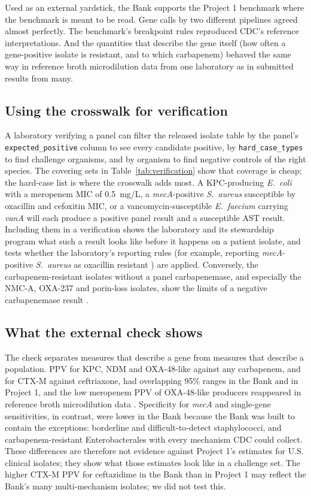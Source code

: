 \documentclass[10pt,twocolumn,letterpaper]{article}
\newcommand{\g}[1]{\textit{#1}}  %
\newcommand{\sau}{\textit{S.~aureus}}
\begin{document}
Used as an external yardstick, the Bank supports the Project 1 benchmark where the benchmark is meant to be read. Gene
calls by two different pipelines agreed almost perfectly. The benchmark's breakpoint rules reproduced CDC's reference
interpretations. And the quantities that describe the gene itself (how often a gene-positive isolate is resistant, and
to which carbapenem) behaved the same way in reference broth microdilution data from one laboratory as in submitted
results from many.

\subsection{Using the crosswalk for verification}

A laboratory verifying a panel can filter the released isolate table by the panel's \texttt{expected\_positive} column to
see every candidate positive, by \texttt{hard\_case\_types} to find challenge organisms, and by organism to find negative
controls of the right species. The covering sets in Table~\ref{tab:verification} show that coverage is cheap; the
hard-case list is where the crosswalk adds most. A KPC-producing \textit{E.~coli} with a meropenem MIC of 0.5~mg/L, a
\g{mecA}-positive \sau{} susceptible by oxacillin and cefoxitin MIC, or a vancomycin-susceptible \textit{E.~faecium}
carrying \g{vanA} will each produce a positive panel result and a susceptible AST result. Including them in a
verification shows the laboratory and its stewardship program what such a result looks like before it happens on a
patient isolate, and tests whether the laboratory's reporting rules (for example, reporting \g{mecA}-positive \sau{} as
oxacillin resistant \cite{clsi2025}) are applied. Conversely, the carbapenem-resistant isolates without a panel
carbapenemase, and especially the NMC-A, OXA-237 and porin-loss isolates, show the limits of a negative carbapenemase
result \cite{tamma2017,pitout2015}.

\subsection{What the external check shows}

The check separates measures that describe a gene from measures that describe a population. PPV for KPC, NDM and
OXA-48-like against any carbapenem, and for CTX-M against ceftriaxone, had overlapping 95\% ranges in the Bank and
in Project 1, and
the low meropenem PPV of OXA-48-like producers reappeared in reference broth microdilution data \cite{poirel2012}.
Specificity for \g{mecA} and single-gene sensitivities, in contrast, were lower in the Bank because the Bank was built to
contain the exceptions: borderline and difficult-to-detect staphylococci, and carbapenem-resistant Enterobacterales with
every mechanism CDC could collect. These differences are therefore not evidence against Project 1's estimates for U.S.
clinical isolates; they show what those estimates look like in a challenge set. The higher CTX-M PPV for ceftazidime in the Bank
than in Project 1 may reflect the Bank's many multi-mechanism isolates; we did not test this.
\end{document}
